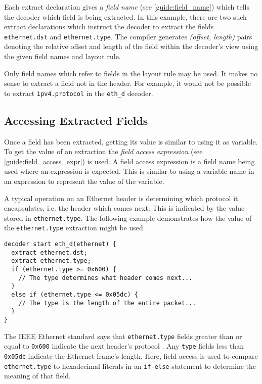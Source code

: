 Each extract declaration gives a \emph{field name} (see \ref{guide:field_name}) 
which tells the decoder which field is being extracted. 
In this example, there are
two such extract declarations which instruct the decoder to extract
the fields \texttt{ethernet.dst} and \texttt{ethernet.type}.
The compiler generates \textit{(offset, length)} pairs 
denoting the relative offset and length of the field within the decoder's view using the given field names and layout rule. 

Only field names which refer to fields in the layout rule may be used. It makes no sense to extract a field not in the header. 
For example, it would not be possible to extract \texttt{ipv4.protocol} in the \texttt{eth\_d} decoder. 

\subsection{Accessing Extracted Fields} \label{tut:decoder_access}

Once a field has been extracted, getting its value is similar to using
it as variable.
To get the value of an extraction
the \textit{field access expression} (see \ref{guide:field_access_expr}) is used.
A field access expression is a field name being used where
an expression is expected. This is similar to using a variable name
in an expression to represent the value of the variable.

A typical operation on an Ethernet header is determining which protocol
it encapsulates, i.e. the header which comes next. This is indicated
by the value stored in \texttt{ethernet.type}.
The following example demonstrates how the value of the \texttt{ethernet.type} 
extraction might be used.

\begin{codepage}
\begin{lstlisting}
decoder start eth_d(ethernet) {
  extract ethernet.dst;
  extract ethernet.type;
  if (ethernet.type >= 0x600) {
    // The type determines what header comes next...
  }
  else if (ethernet.type <= 0x05dc) {
    // The type is the length of the entire packet...
  }
}
\end{lstlisting}
\end{codepage}


The IEEE Ethernet standard says that \texttt{ethernet.type} fields greater than 
or equal to \texttt{0x600} indicate the next header's protocol \cite{eth_std}. 
Any \texttt{type} fields less than \texttt{0x05dc} indicate the Ethernet frame's 
length. 
Here, field access is used to compare \texttt{ethernet.type} to 
hexadecimal literals in an \texttt{if-else} statement to determine the meaning of 
that field.

